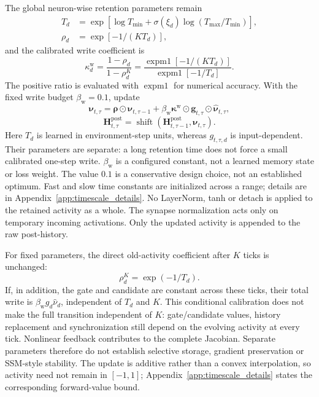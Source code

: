 \documentclass{article}
\begin{document}
The global neuron-wise retention parameters remain
\begin{equation}
\begin{aligned}
T_d&=\exp\!\left[\log T_{\min}+\sigma(\xi_d)
\log(T_{\max}/T_{\min})\right],\\
\rho_d&=\exp[-1/(K T_d)],
\end{aligned}
\label{eq:ct_time_constants}
\end{equation}
and the calibrated write coefficient is
\begin{equation}
\kappa^{\mathrm w}_d=\frac{1-\rho_d}{1-\rho_d^K}
=\frac{\operatorname{expm1}[-1/(K T_d)]}
{\operatorname{expm1}[-1/T_d]}.
\label{eq:ct_write_calibration}
\end{equation}
The positive ratio is evaluated with $\operatorname{expm1}$ for numerical accuracy. With the fixed write budget $\beta_{\mathrm w}=0.1$, update
\begin{equation}
\boldsymbol\nu_{t,\tau}=\boldsymbol\rho\odot\boldsymbol\nu_{t,\tau-1}
+\beta_{\mathrm w}\boldsymbol\kappa^{\mathrm w}\odot\mathbf g_{t,\tau}
\odot\widehat{\boldsymbol\nu}_{t,\tau},
\label{eq:ct_activity_retention}
\end{equation}
\begin{equation}
\mathbf H_{t,\tau}^{\mathrm{post}}=\operatorname{shift}
(\mathbf H_{t,\tau-1}^{\mathrm{post}},\boldsymbol\nu_{t,\tau}).
\label{eq:ct_post_history}
\end{equation}
Here $T_d$ is learned in environment-step units, whereas $g_{t,\tau,d}$ is input-dependent. Their parameters are separate: a long retention time does not force a small calibrated one-step write. $\beta_{\mathrm w}$ is a configured constant, not a learned memory state or loss weight. The value $0.1$ is a conservative design choice, not an established optimum. Fast and slow time constants are initialized across a range; details are in Appendix~\ref{app:timescale_details}. No LayerNorm, tanh or detach is applied to the retained activity as a whole. The synapse normalization acts only on temporary incoming activations. Only the updated activity is appended to the raw post-history.

For fixed parameters, the direct old-activity coefficient after $K$ ticks is unchanged:
\begin{equation}
\rho_d^K=\exp(-1/T_d).
\label{eq:ct_environment_decay}
\end{equation}
If, in addition, the gate and candidate are constant across these ticks, their total write is $\beta_{\mathrm w}g_d\widehat\nu_d$, independent of $T_d$ and $K$. This conditional calibration does not make the full transition independent of $K$: gate/candidate values, history replacement and synchronization still depend on the evolving activity at every tick. Nonlinear feedback contributes to the complete Jacobian. Separate parameters therefore do not establish selective storage, gradient preservation or SSM-style stability. The update is additive rather than a convex interpolation, so activity need not remain in $[-1,1]$; Appendix~\ref{app:timescale_details} states the corresponding forward-value bound.
\end{document}
